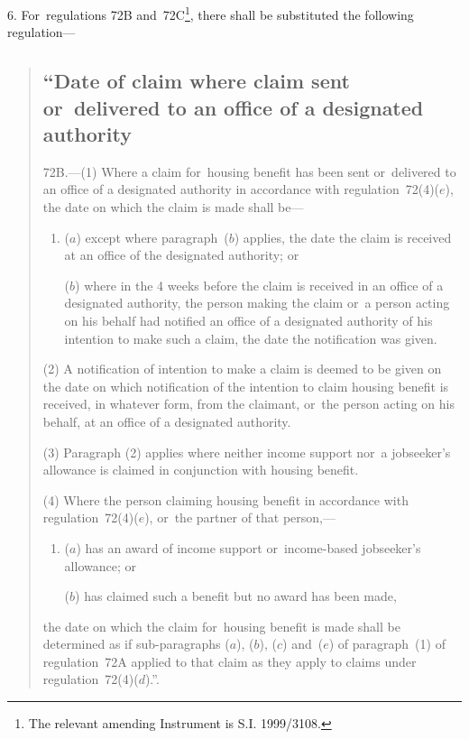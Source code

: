 \documentclass[12pt,a4paper]{article}
\begin{document}
6.  For~regulations 72B and~72C\footnote{\frenchspacing The relevant amending Instrument is S.I. 1999/3108.}, there shall be substituted the following regulation—
\begin{quotation}
\subsection*{“Date of claim where claim sent or~delivered to an office of a designated authority}

72B.---(1)  Where a claim for~housing benefit has been sent or~delivered to an office of a designated authority in accordance with regulation~72(4)($e$), the date on which the claim is made shall be—
\begin{enumerate}\item[]
($a$) except where paragraph~($b$)  applies, the date the claim is received at an office of the designated authority; or

($b$) where in the 4 weeks before the claim is received in an office of a designated authority, the person making the claim or~a person acting on his behalf had notified an office of a designated authority of his intention to make such a claim, the date the notification was given.
\end{enumerate}

(2) A notification of intention to make a claim is deemed to be given on the date on which notification of the intention to claim housing benefit is received, in whatever form, from the claimant, or~the person acting on his behalf, at an office of a designated authority.

(3) Paragraph (2) applies where neither income support nor~a jobseeker’s allowance is claimed in conjunction with housing benefit.

(4) Where the person claiming housing benefit in accordance with regulation~72(4)($e$), or~the partner of that person,—
\begin{enumerate}\item[]
($a$) has an award of income support or~income-based jobseeker’s allowance; or

($b$) has claimed such a benefit but no award has been made,
\end{enumerate}
the date on which the claim for~housing benefit is made shall be determined as if sub-paragraphs ($a$), ($b$), ($c$)  and~($e$)  of paragraph~(1) of regulation~72A applied to that claim as they apply to claims under regulation~72(4)($d$).”.
\end{quotation}
\end{document}
